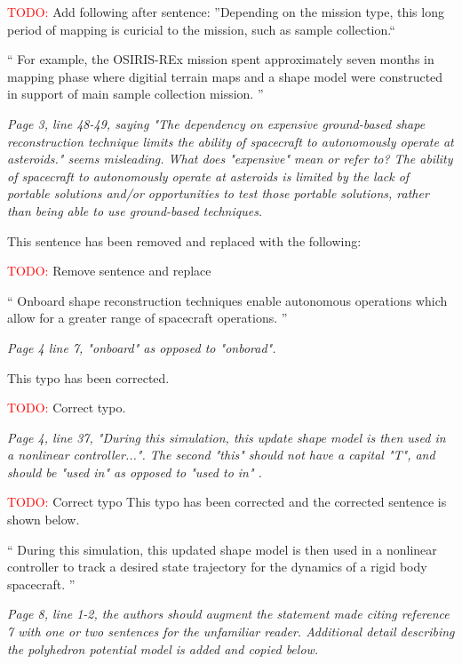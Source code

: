 \documentclass[11pt]{article}
\newcommand{\todo}{{\large \textcolor{red}{TODO: }}}
\newenvironment{correction}{\begin{list}{}{\setlength{\leftmargin}{1cm}\setlength{\rightmargin}{1cm}}\vspace{\parsep}\item[]``}{''\end{list}}
\newcommand{\comment}[1]{\item \itshape #1 \normalfont}
\begin{document}
\begin{itemize}
\todo Add following after sentence: ''Depending on the mission type, this long period of mapping is curicial to the mission, such as sample collection.``
\begin{correction}
For example, the OSIRIS-REx mission spent approximately seven months in mapping phase where digitial terrain maps and a shape model were constructed in support of main sample collection mission.
\end{correction}

\comment{
Page 3, line 48-49, saying "The dependency on expensive ground-based shape reconstruction technique limits the ability of spacecraft to autonomously operate at asteroids." seems misleading.
What does "expensive" mean or refer to? The ability of spacecraft to autonomously operate at asteroids is limited by the lack of portable solutions and/or opportunities to test those portable solutions, rather than being able to use ground-based techniques.
}

This sentence has been removed and replaced with the following:

\todo Remove sentence and replace

\begin{correction}
Onboard shape reconstruction techniques enable autonomous operations which allow for a greater range of spacecraft operations.
\end{correction}


\comment{
Page 4 line 7, "onboard" as opposed to "onborad".
}

This typo has been corrected.

\todo Correct typo.

\comment{
Page 4, line 37, "During this simulation, this update shape model is then used in a nonlinear controller...". The second "this" should not have a capital "T", and should be "used in" as opposed to "used to in" .
}

\todo Correct typo
This typo has been corrected and the corrected sentence is shown below.

\begin{correction}
During this simulation, this updated shape model is then used in a nonlinear controller to track a desired state trajectory for the dynamics of a rigid body spacecraft.
\end{correction}

\comment{
Page 8, line 1-2, the authors should augment the statement made citing reference 7 with one or two sentences for the unfamiliar reader.  
}
Additional detail describing the polyhedron potential model is added and copied below.


\end{itemize}
\end{document}
